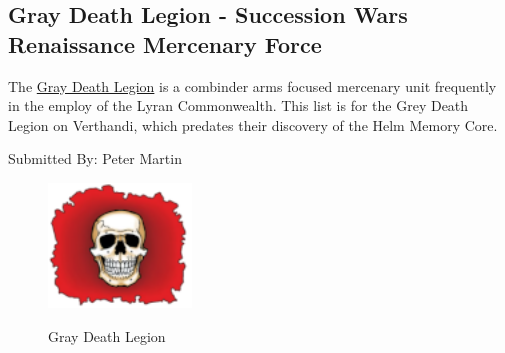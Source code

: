 \subsection{Gray Death Legion - Succession Wars Renaissance Mercenary Force}

The \href{https://www.sarna.net/wiki/Gray_Death_Legion}{Gray Death Legion} is a combinder arms focused mercenary unit frequently in the employ of the Lyran Commonwealth.
This list is for the Grey Death Legion on Verthandi, which predates their discovery of the Helm Memory Core.

Submitted By: Peter Martin

\begin{figure}[!h]
  \centering
  \includegraphics[alt='Gray Death Legion Logo', width=1.5in, height=1.306in]{img/Gray-Death-Legion.png}
  \caption*{Gray Death Legion}
\end{figure}

